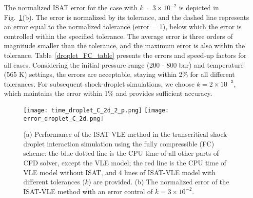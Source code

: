 The normalized ISAT error for the case with $k=3\times10^{-2}$ is depicted in Fig.~\ref{droplet_PE}(b). The error is normalized by its tolerance, and the dashed line represents an error equal to the normalized tolerance (error = 1), below which the error is controlled within the specified tolerance. The average error is three orders of magnitude smaller than the tolerance, and the maximum error is also within the tolerance. Table~\ref{droplet_FC_table} presents the errors and speed-up factors for all cases. Considering the initial pressure range (200 - 800 bar) and temperature (565 K) settings, the errors are acceptable, staying within 2\% for all different tolerances. For subsequent shock-droplet simulations, we choose $k=2 \times 10^{-3}$, which maintains the error within 1\% and provides sufficient accuracy.



\begin{figure}[htbp]
\centering
\texttt{[image: time\_droplet\_C\_2d\_2\_p.png]}
\texttt{[image: error\_droplet\_C\_2d.png]}
\caption{(a) Performance of the ISAT-VLE method in the transcritical shock-droplet interaction simulation using the fully compressible (FC) scheme: the blue dotted line is the CPU time of all other parts of CFD solver, except the VLE model; the red line is the CPU time of VLE model without ISAT, and 4 lines of ISAT-VLE model with different tolerances ($k$) are provided. (b) The normalized error of the ISAT-VLE method with an error control of $k = 3 \times 10^{-2}$.}
\label{droplet_PE} 
\end{figure}



